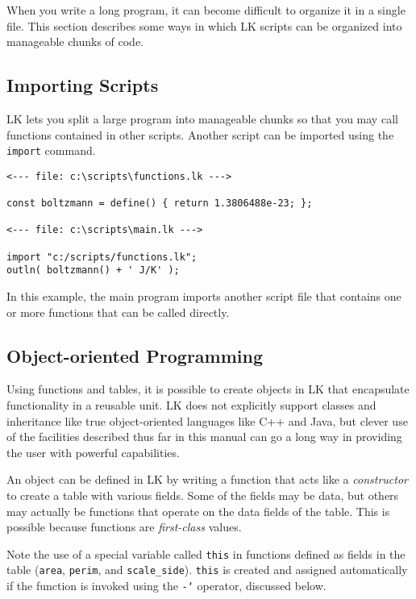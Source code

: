 \documentclass{article}
\newcommand\gt{\char`\>}
\begin{document}
When you write a long program, it can become difficult to organize it in a single file.  This section describes some ways in which LK scripts can be organized into manageable chunks of code.

\subsection{Importing Scripts}

LK lets you split a large program into manageable chunks so that you may call functions contained in other scripts.  Another script can be imported using the \texttt{import} command.

\begin{verbatim}
<--- file: c:\scripts\functions.lk --->

const boltzmann = define() { return 1.3806488e-23; };

<--- file: c:\scripts\main.lk --->

import "c:/scripts/functions.lk";
outln( boltzmann() + ' J/K' );

\end{verbatim}

In this example, the main program imports another script file that contains one or more functions that can be called directly.

\subsection{Object-oriented Programming}

Using functions and tables, it is possible to create objects in LK that encapsulate functionality in a reusable unit.  LK does not explicitly support classes and inheritance like true object-oriented languages like C++ and Java, but clever use of the facilities described thus far in this manual can go a long way in providing the user with powerful capabilities.

An object can be defined in LK by writing a function that acts like a \emph{constructor} to create a table with various fields.  Some of the fields may be data, but others may actually be functions that operate on the data fields of the table.  This is possible because functions are \emph{first-class} values.

Note the use of a special variable called \texttt{this} in functions defined as fields in the table (\texttt{area}, \texttt{perim}, and \texttt{scale\_side}).  \texttt{this} is created and assigned automatically if the function is invoked using the \texttt{-\gt} operator, discussed below.
\end{document}
